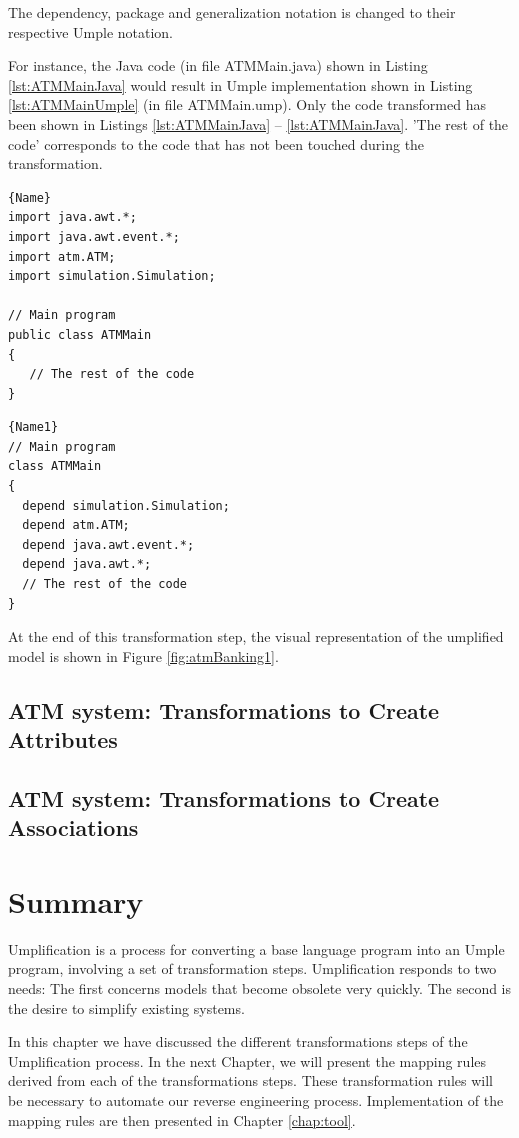The dependency, package and generalization notation is changed to their respective Umple notation.

For instance, the Java code (in file ATMMain.java) shown in Listing  \ref{lst:ATMMainJava} would result in  Umple implementation shown in Listing  \ref{lst:ATMMainUmple} (in file ATMMain.ump). Only the code transformed has been shown in Listings \ref{lst:ATMMainJava} -- \ref{lst:ATMMainJava}. 'The rest of the code' corresponds to the code that has not been touched during the transformation. 

\noindent\begin{minipage}{.45\textwidth}
\begin{lstlisting}[style=java,caption=ATMMain.java,label=lst:ATMMainJava]{Name}
import java.awt.*;
import java.awt.event.*;
import atm.ATM;
import simulation.Simulation;

// Main program  
public class ATMMain
{
   // The rest of the code
}
\end{lstlisting}
\end{minipage}\hfill
\begin{minipage}{.45\textwidth}
\begin{lstlisting}[style=UmpleIn,caption=ATMMain.ump,label=lst:ATMMainUmple]{Name1}
// Main program  
class ATMMain
{
  depend simulation.Simulation;
  depend atm.ATM;
  depend java.awt.event.*;
  depend java.awt.*;
  // The rest of the code
}
\end{lstlisting}
\end{minipage}

At the end of this transformation step, the visual representation of the umplified model is shown in Figure \ref{fig:atmBanking1}.

\subsection{ATM system: Transformations to Create Attributes}

\subsection{ATM system: Transformations to Create Associations}

\section{Summary}

Umplification is a process for converting a base language program into an Umple program, involving a set of transformation steps. Umplification responds to two needs: The first concerns models that become obsolete very quickly. The second is the desire to simplify existing systems.

In this chapter we have discussed the different transformations steps of the Umplification process. In the next Chapter, we will present the mapping rules derived from each of the transformations steps. These transformation rules will be necessary to automate our reverse engineering process. Implementation of the mapping rules are then presented in Chapter \ref{chap:tool}.
